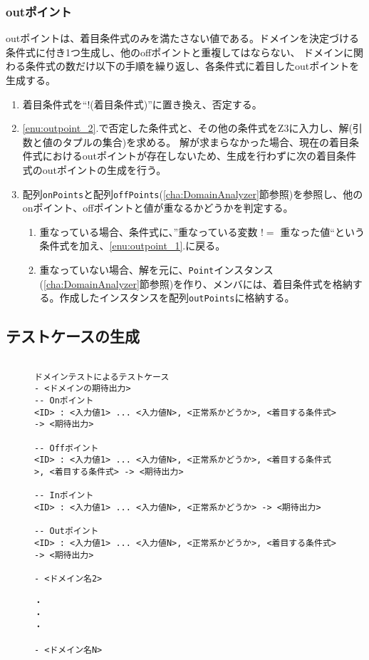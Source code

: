 \documentclass[uplatex, report, a4j, 10pt]{jsbook}
\newcommand\ttt[1]{\texttt{#1}}
\begin{document}
\subsubsection{outポイント}
outポイントは、着目条件式のみを満たさない値である。ドメインを決定づける条件式に付き1つ生成し、他のoffポイントと重複してはならない、
ドメインに関わる条件式の数だけ以下の手順を繰り返し、各条件式に着目したoutポイントを生成する。
\begin{enumerate}
  \item\label{enu:outpoint_2} 着目条件式を``$!$(着目条件式)''に置き換え、否定する。
  \item\label{enu:outpoint_1} \ref{enu:outpoint_2}.で否定した条件式と、その他の条件式をZ3に入力し、解(引数と値のタプルの集合)を求める。
        解が求まらなかった場合、現在の着目条件式におけるoutポイントが存在しないため、生成を行わずに次の着目条件式のoutポイントの生成を行う。
  \item 配列\ttt{onPoints}と配列\ttt{offPoints}(\ref{cha:DomainAnalyzer}節参照)を参照し、他のonポイント、offポイントと値が重なるかどうかを判定する。
        \begin{enumerate}
          \item 重なっている場合、条件式に、''重なっている変数 $!=$ 重なった値``という条件式を加え、\ref{enu:outpoint_1}.に戻る。
          \item 重なっていない場合、解を元に、\ttt{Point}インスタンス(\ref{cha:DomainAnalyzer}節参照)を作り、メンバ\forcusedConditionalExpression{}には、着目条件式を格納する。作成したインスタンスを配列\ttt{outPoints}に格納する。
        \end{enumerate}
\end{enumerate}

\subsection{テストケースの生成}
\lstset{language=}
\begin{figure}[tp]
  \begin{lstlisting}[caption=ドメイン分析テストのためのテストケースの出力フォーマット,label=fig:dmin_output_format]

ドメインテストによるテストケース
- <ドメインの期待出力>
-- Onポイント
<ID> : <入力値1> ... <入力値N>, <正常系かどうか>, <着目する条件式> -> <期待出力>

-- Offポイント
<ID> : <入力値1> ... <入力値N>, <正常系かどうか>, <着目する条件式>, <着目する条件式> -> <期待出力>

-- Inポイント
<ID> : <入力値1> ... <入力値N>, <正常系かどうか> -> <期待出力>

-- Outポイント
<ID> : <入力値1> ... <入力値N>, <正常系かどうか>, <着目する条件式> -> <期待出力>

- <ドメイン名2>

・
・
・

- <ドメイン名N>

\end{lstlisting}
\end{figure}
\end{document}
